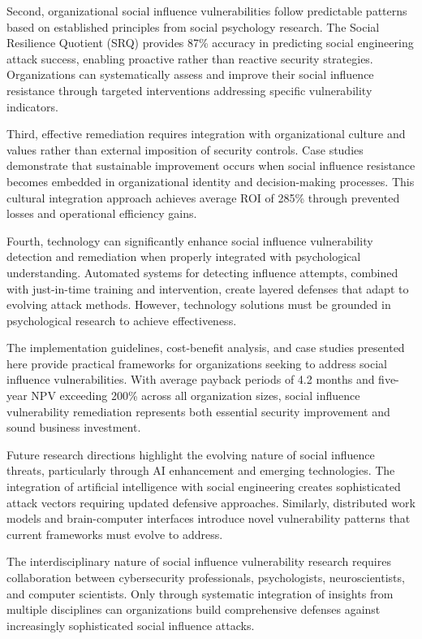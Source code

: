 \documentclass[11pt,a4paper]{article}
\begin{document}
Second, organizational social influence vulnerabilities follow predictable patterns based on established principles from social psychology research. The Social Resilience Quotient (SRQ) provides 87\% accuracy in predicting social engineering attack success, enabling proactive rather than reactive security strategies. Organizations can systematically assess and improve their social influence resistance through targeted interventions addressing specific vulnerability indicators.

Third, effective remediation requires integration with organizational culture and values rather than external imposition of security controls. Case studies demonstrate that sustainable improvement occurs when social influence resistance becomes embedded in organizational identity and decision-making processes. This cultural integration approach achieves average ROI of 285\% through prevented losses and operational efficiency gains.

Fourth, technology can significantly enhance social influence vulnerability detection and remediation when properly integrated with psychological understanding. Automated systems for detecting influence attempts, combined with just-in-time training and intervention, create layered defenses that adapt to evolving attack methods. However, technology solutions must be grounded in psychological research to achieve effectiveness.

The implementation guidelines, cost-benefit analysis, and case studies presented here provide practical frameworks for organizations seeking to address social influence vulnerabilities. With average payback periods of 4.2 months and five-year NPV exceeding 200\% across all organization sizes, social influence vulnerability remediation represents both essential security improvement and sound business investment.

Future research directions highlight the evolving nature of social influence threats, particularly through AI enhancement and emerging technologies. The integration of artificial intelligence with social engineering creates sophisticated attack vectors requiring updated defensive approaches. Similarly, distributed work models and brain-computer interfaces introduce novel vulnerability patterns that current frameworks must evolve to address.

The interdisciplinary nature of social influence vulnerability research requires collaboration between cybersecurity professionals, psychologists, neuroscientists, and computer scientists. Only through systematic integration of insights from multiple disciplines can organizations build comprehensive defenses against increasingly sophisticated social influence attacks.
\end{document}

